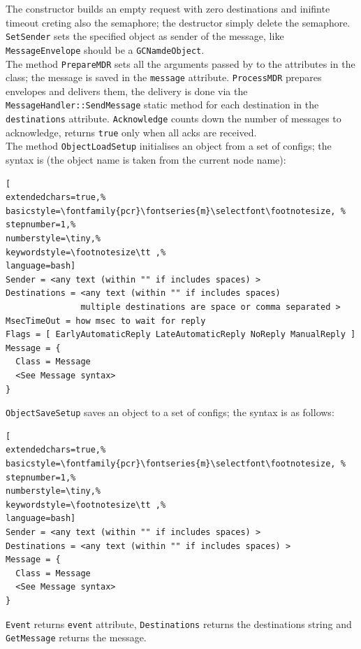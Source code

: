 The constructor builds an empty request with zero destinations and inifinte timeout creting also the semaphore; the destructor simply delete the semaphore. \texttt{SetSender} sets the specified object as sender of the message, like \texttt{MessageEnvelope} should be a \texttt{GCNamdeObject}.\\

The method \texttt{PrepareMDR} sets all the arguments passed by to the attributes in the class; the message is saved in the \texttt{message} attribute. \texttt{ProcessMDR} prepares envelopes and delivers them, the delivery is done via the \texttt{MessageHandler::SendMessage} static method for each destination in the \texttt{destinations} attribute. \texttt{Acknowledge} counts down the number of messages to acknowledge, returns \texttt{true} only when all acks are received. \\


The method \texttt{ObjectLoadSetup} initialises an object from a set of configs; the syntax is (the object name is taken from the current node name):
\begin{lstlisting}[
extendedchars=true,%
basicstyle=\fontfamily{pcr}\fontseries{m}\selectfont\footnotesize, %
stepnumber=1,%
numberstyle=\tiny,%
keywordstyle=\footnotesize\tt ,%
language=bash]
Sender = <any text (within "" if includes spaces) >
Destinations = <any text (within "" if includes spaces)
               multiple destinations are space or comma separated >
MsecTimeOut = how msec to wait for reply
Flags = [ EarlyAutomaticReply LateAutomaticReply NoReply ManualReply ]
Message = {
  Class = Message
  <See Message syntax>
}
\end{lstlisting}

\texttt{ObjectSaveSetup} saves an object to a set of configs; the syntax is as follows:
\begin{lstlisting}[
extendedchars=true,%
basicstyle=\fontfamily{pcr}\fontseries{m}\selectfont\footnotesize, %
stepnumber=1,%
numberstyle=\tiny,%
keywordstyle=\footnotesize\tt ,%
language=bash]
Sender = <any text (within "" if includes spaces) >
Destinations = <any text (within "" if includes spaces) >
Message = {
  Class = Message
  <See Message syntax>
}
\end{lstlisting}

\texttt{Event} returns \texttt{event} attribute, \texttt{Destinations} returns the destinations string and \texttt{GetMessage} returns the message.

